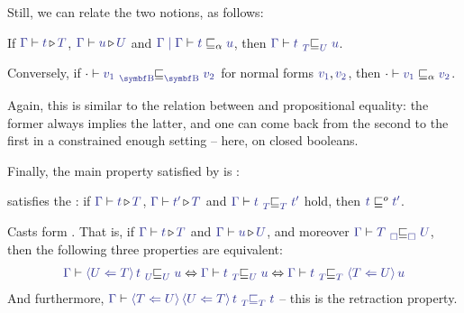 Still, we can relate the two notions, as follows:
\begin{theorem}
  \label{thm:prop-prop-prec}
   
  If $\cinferty{\Gamma}{t}{T}$, $\cinferty{\Gamma}{u}{U}$ and
  $\tcol{\Gamma \mid \Gamma} \vdash \tcol{t} \capre \tcol{u}$, then
  $\tcol{\Gamma} \vdash \tcol{t} \precision{\tcol{T}}{\tcol{U}} \tcol{u}$.
  
  Conversely, if
    $\emptycon \vdash \tcol{v_1} \precision{\tcol{\Bool}}{\tcol{\Bool}}
    \tcol{v_2}$ for normal forms $\tcol{v_1}, \tcol{v_2}$, then
    $\emptycon \vdash \tcol{v_1} \capre \tcol{v_2}$.

\end{theorem}
Again, this is similar to the relation between  and propositional equality:
the former always implies the latter, and one can come back from the second to the first in
a constrained enough setting – here, on closed booleans.

Finally, the main property satisfied by  is :

\begin{theorem}[\kl{Graduality}]
  \label{thm:graduality}

   satisfies the : if
  $\cinferty{\Gamma}{t}{T}$, $\cinferty{\Gamma}{t'}{T}$ and
  $\tcol{\Gamma} \vdash \tcol{t} \precision{\tcol{T}}{\tcol{T}} \tcol{t'}$ hold, then
  $ \tcol{t} \obsRef \tcol{t'}$.
  
  Casts form . That is, if
  $\cinferty{\Gamma}{t}{T}$ and $\cinferty{\Gamma}{u}{U}$,
  and moreover
    $\tcol{\Gamma} \vdash \tcol{T} \precision{\tcol{\square}}{\tcol{\square}} \tcol{U}$,
  then the following three properties are equivalent:
  \begin{align*}
    \tcol{\Gamma} \vdash \tcol{\cast{T}{U}{t}} \precision{\tcol{U}}{\tcol{U}} \tcol{u}
    \Leftrightarrow  \tcol{\Gamma} \vdash \tcol{t} \precision{\tcol{T}}{\tcol{U}} \tcol{u}
    \Leftrightarrow  \tcol{\Gamma} \vdash \tcol{t}
    \precision{\tcol{T}}{\tcol{T}} \tcol{\cast{U}{T} u}
  \end{align*}
  And furthermore,
    $\tcol{\Gamma} \vdash \tcol{{\cast{U}{T}{\cast{T}{U}{t}}} \precision{\tcol{T}}{\tcol{T}} \tcol{t}}$ – this is the retraction property.
\end{theorem}



